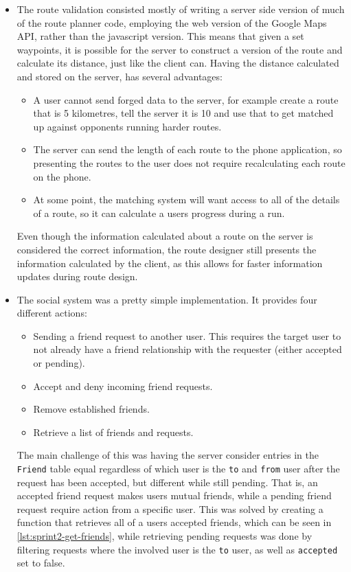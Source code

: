 \begin{itemize}
 \item The route validation consisted mostly of writing a server side version of much of the route planner code, employing the web version of the Google Maps \ac{API}, rather than the javascript version. This means that given a set waypoints, it is possible for the server to construct a version of the route and calculate its distance, just like the client can. Having the distance calculated and stored on the server, has several advantages:
  \begin{itemize}
   \item A user cannot send forged data to the server, for example create a route that is 5 kilometres, tell the server it is 10 and use that to get matched up against opponents running harder routes.
   \item The server can send the length of each route to the phone application, so presenting the routes to the user does not require recalculating each route on the phone.
   \item At some point, the matching system will want access to all of the details of a route, so it can calculate a users progress during a run.
  \end{itemize}
  Even though the information calculated about a route on the server is considered the correct information, the route designer still presents the information calculated by the client, as this allows for faster information updates during route design.
  
 \item The social system was a pretty simple implementation. It provides four different actions:
  \begin{itemize}
   \item Sending a friend request to another user. This requires the target user to not already have a friend relationship with the requester (either accepted or pending).
   \item Accept and deny incoming friend requests.
   \item Remove established friends.
   \item Retrieve a list of friends and requests.
  \end{itemize}
  The main challenge of this was having the server consider entries in the \texttt{Friend} table equal regardless of which user is the \texttt{to} and \texttt{from} user after the request has been accepted, but different while still pending. That is, an accepted friend request makes users mutual friends, while a pending friend request require action from a specific user. This was solved by creating a function that retrieves all of a users accepted friends, which can be seen in \autoref{lst:sprint2-get-friends}, while retrieving pending requests was done by filtering requests where the involved user is the \texttt{to} user, as well as \texttt{accepted} set to false.
\end{itemize}

